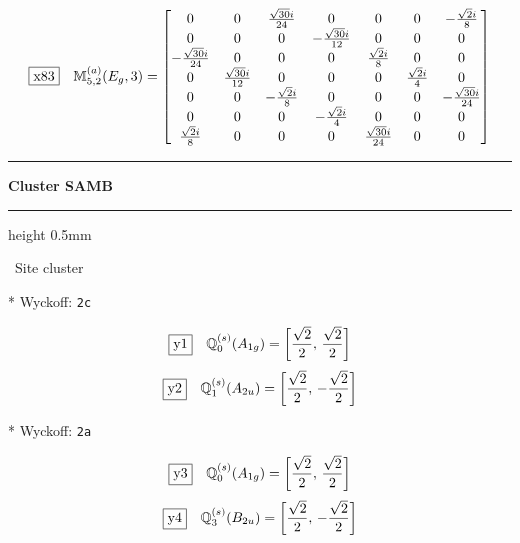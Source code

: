 \documentclass[fleqn,10pt,landscape]{jsarticle}
\begin{document}
\begin{dmath*}
\fbox{x83}\quad \mathbb{M}_{5,2}^{(a)}(E_{g},3)=\begin{bmatrix} 0 & 0 & \frac{\sqrt{30} i}{24} & 0 & 0 & 0 & - \frac{\sqrt{2} i}{8} \\ 0 & 0 & 0 & - \frac{\sqrt{30} i}{12} & 0 & 0 & 0 \\ - \frac{\sqrt{30} i}{24} & 0 & 0 & 0 & \frac{\sqrt{2} i}{8} & 0 & 0 \\ 0 & \frac{\sqrt{30} i}{12} & 0 & 0 & 0 & \frac{\sqrt{2} i}{4} & 0 \\ 0 & 0 & - \frac{\sqrt{2} i}{8} & 0 & 0 & 0 & - \frac{\sqrt{30} i}{24} \\ 0 & 0 & 0 & - \frac{\sqrt{2} i}{4} & 0 & 0 & 0 \\ \frac{\sqrt{2} i}{8} & 0 & 0 & 0 & \frac{\sqrt{30} i}{24} & 0 & 0 \end{bmatrix}
\end{dmath*}
\vspace{5mm}
\noindent \rule[0.5mm]{5mm}{0.5mm}\hspace{3mm}\textbf{Cluster SAMB}\hspace{3mm}\leaders\hrule height 0.5mm\hfill\kern0pt
\vspace{3mm}

\noindent\textbullet\, Site cluster

\vspace{5mm}

\noindent ** Wyckoff: \texttt{2c}

\begin{dmath*}
\fbox{y1}\quad \mathbb{Q}_{0}^{(s)}(A_{1g})=\left[ \frac{\sqrt{2}}{2},\, \frac{\sqrt{2}}{2} \right]
\end{dmath*}
\begin{dmath*}
\fbox{y2}\quad \mathbb{Q}_{1}^{(s)}(A_{2u})=\left[ \frac{\sqrt{2}}{2},\, - \frac{\sqrt{2}}{2} \right]
\end{dmath*}
\vspace{5mm}

\noindent ** Wyckoff: \texttt{2a}

\begin{dmath*}
\fbox{y3}\quad \mathbb{Q}_{0}^{(s)}(A_{1g})=\left[ \frac{\sqrt{2}}{2},\, \frac{\sqrt{2}}{2} \right]
\end{dmath*}
\begin{dmath*}
\fbox{y4}\quad \mathbb{Q}_{3}^{(s)}(B_{2u})=\left[ \frac{\sqrt{2}}{2},\, - \frac{\sqrt{2}}{2} \right]
\end{dmath*}
\vspace{5mm}
\end{document}

